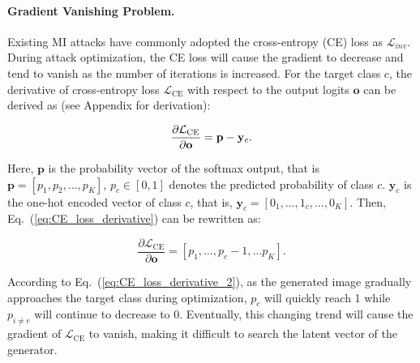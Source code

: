\documentclass[letterpaper]{article} %
\newcommand{\Eref}[1]{Eq.~(\ref{#1})}
\begin{document}
\paragraph{Gradient Vanishing Problem.}
Existing MI attacks have commonly adopted the cross-entropy (CE) loss as $\mathcal{L}_{inv}$. During attack optimization, the CE loss will cause the gradient to decrease and tend to vanish as the number of iterations is increased. 
For the target class $c$, the derivative of cross-entropy loss $\mathcal{L}_{\text{CE}}$ with respect to the output logits $\mathbf{o}$ can be derived as (see Appendix for derivation):
\begin{linenomath*}
\begin{equation}\label{eq:CE_loss_derivative}
\frac{\partial  \mathcal{L}_{\text{CE}}}{\partial \mathbf{o}}=\mathbf{p}-\mathbf{y}_{c}. \\
\end{equation}
\end{linenomath*}
Here, $\mathbf{p}$ is the probability vector of the softmax output, that is $\mathbf{p}=\left[p_{1}, p_{2}, \dots ,p_{K}\right]$, $p_c \in [0,1]$ denotes the predicted probability of class $c$. $\mathbf{y}_{c}$ is the one-hot encoded vector of class $c$, that is, $\mathbf{y}_{c}=\left[0_{1}, \dots, 1_{c}, \dots ,0_{K}\right]$. Then,  \Eref{eq:CE_loss_derivative} can be rewritten as:
\begin{linenomath*}
\begin{equation}\label{eq:CE_loss_derivative_2}
\frac{\partial  \mathcal{L}_{\text{CE}}}{\partial \mathbf{o}} =\left[p_{1}, \dots, p_{c}-1, \dots p_{K}\right].
\end{equation}
\end{linenomath*}
According to \Eref{eq:CE_loss_derivative_2}, as the generated image gradually approaches the target class during optimization, $p_c$ will quickly reach 1 while $p_{i \neq c}$ will continue to decrease to 0. Eventually, this changing trend will cause the gradient of $\mathcal{L}_\text{CE}$ to vanish, making it difficult to search the latent vector of the generator.

    
\end{document}
